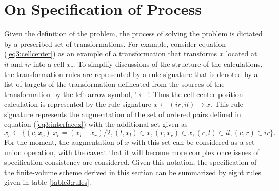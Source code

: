 \documentclass[10pt,epsf]{book}
\begin{document}
\section{On Specification of Process}

Given the definition of the problem, the process of solving the
problem is dictated by a prescribed set of transformations.  For
example, consider equation (\ref{eq3:cellcenter}) as an example of a
transformation that transforms $x$ located at $il$ and $ir$ into a
cell $x_c$.  To simplify discussions of the structure of the
calculations, the transformation rules are represented by a rule
signature that is denoted by a list of targets of the transformation
delineated from the sources of the transformation by the left arrow
symbol, '$\leftarrow$'.  Thus the cell center position calculation is
represented by the rule signature $x \leftarrow (ir,il)\rightarrow x$.
This rule signature represents the augmentation of the set of ordered
pairs defined in equation (\ref{eq3:interfacex}) with the additional
set given as
\begin{equation}
x_c \leftarrow\lbrace (c, x_c) |  x_c = (x_l + x_r)/2,
                               (l,x_l) \in x, (r,x_r) \in x, 
                               (c,l) \in il, (c,r) \in ir \rbrace.
\end{equation}
For the moment, the augmentation of $x$ with this set can be
considered as a set union operation, with the caveat that it will
become more complex once issues of specification consistency are
considered.  Given this notation, the specification of the
finite-volume scheme derived in this section can be summarized by
eight rules given in table \ref{table3:rules}.
\end{document}

